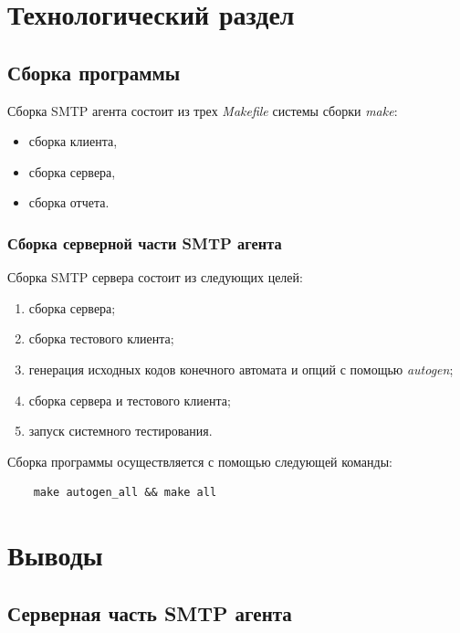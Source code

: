 \documentclass[a4paper,12pt]{report}
\begin{document}
% 

\chapter{Технологический раздел}

\section{Сборка программы}

Сборка SMTP агента состоит из трех \textit{Makefile} системы сборки \textit{make}:

\begin{itemize}
    \item сборка клиента,
    \item сборка сервера,
    \item сборка отчета.
\end{itemize}

\subsection{Сборка серверной части SMTP агента}

Сборка SMTP сервера состоит из следующих целей:

\begin{enumerate}
    \item сборка сервера;
    \item сборка тестового клиента;
    \item генерация исходных кодов конечного автомата и опций с помощью \textit{autogen};
    \item сборка сервера и тестового клиента;
    \item запуск системного тестирования.
\end{enumerate}

Сборка программы осуществляется с помощью следующей команды:
\begin{verbatim}
    make autogen_all && make all
\end{verbatim}



\chapter*{Выводы}

\section{Серверная часть SMTP агента}
\end{document}

